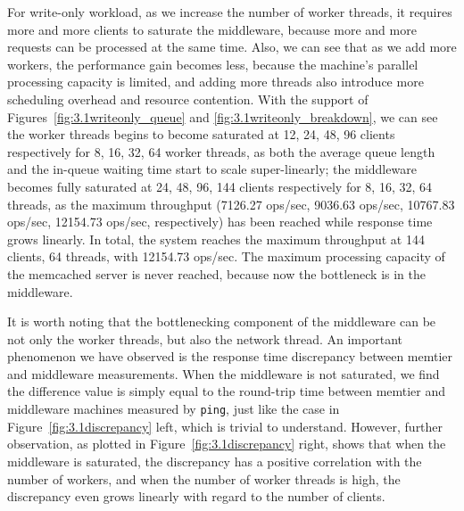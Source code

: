 For write-only workload, as we increase the number of worker threads, it requires more and more clients to saturate the middleware, because more and more requests can be processed at the same time. Also, we can see that as we add more workers, the performance gain becomes less, because the machine's parallel processing capacity is limited, and adding more threads also introduce more scheduling overhead and resource contention. With the support of Figures~\ref{fig:3.1writeonly_queue} and \ref{fig:3.1writeonly_breakdown}, we can see the worker threads begins to become saturated at 12, 24, 48, 96 clients respectively for 8, 16, 32, 64 worker threads, as both the average queue length and the in-queue waiting time start to scale super-linearly; the middleware becomes fully saturated at 24, 48, 96, 144 clients respectively for 8, 16, 32, 64 threads, as the maximum throughput (7126.27 ops/sec, 9036.63 ops/sec, 10767.83 ops/sec, 12154.73 ops/sec, respectively) has been reached while response time grows linearly. In total, the system reaches the maximum throughput at 144 clients, 64 threads, with 12154.73 ops/sec. The maximum processing capacity of the memcached server is never reached, because now the bottleneck is in the middleware.


It is worth noting that the bottlenecking component of the middleware can be not only the worker threads, but also the network thread. An important phenomenon we have observed is the response time discrepancy between memtier and middleware measurements. When the middleware is not saturated, we find the difference value is simply equal to the round-trip time between memtier and middleware machines measured by \texttt{ping}, just like the case in Figure~\ref{fig:3.1discrepancy} left, which is trivial to understand. However, further observation, as plotted in Figure~\ref{fig:3.1discrepancy} right, shows that when the middleware is saturated, the discrepancy has a positive correlation with the number of workers, and when the number of worker threads is high, the discrepancy even grows linearly with regard to the number of clients. 

